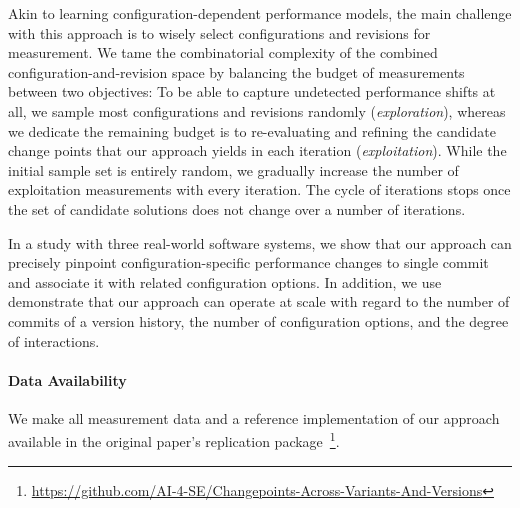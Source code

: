 \documentclass[utf8,biblatex]{lni}
\begin{document}
Akin to learning configuration-dependent performance models, the main challenge with this approach is to wisely select configurations and revisions for measurement. We tame the combinatorial complexity of the combined configuration-and-revision space by balancing the budget of measurements between two objectives: To be able to capture undetected performance shifts at all, we sample most configurations and revisions randomly (\textit{exploration}), whereas we dedicate the remaining budget is to re-evaluating and refining the candidate change points that our approach yields in each iteration (\textit{exploitation}). While the initial sample set is entirely random, we gradually increase the number of exploitation measurements with every iteration. The cycle of iterations stops once the set of candidate solutions does not change over a number of iterations. 

In a study with three real-world software systems, we show that our approach can precisely pinpoint configuration-specific performance changes to single commit and associate it with related configuration options. In addition, we use demonstrate that our approach can operate at scale with regard to the number of commits of a version history, the number of configuration options, and the degree of interactions.
\paragraph*{Data Availability} 
We make all measurement data and a reference implementation of our approach~\cite{muehlbauer_identifying_2020} available in the original paper's replication package~\footnote{\url{https://github.com/AI-4-SE/Changepoints-Across-Variants-And-Versions}}.

\printbibliography
\end{document}
